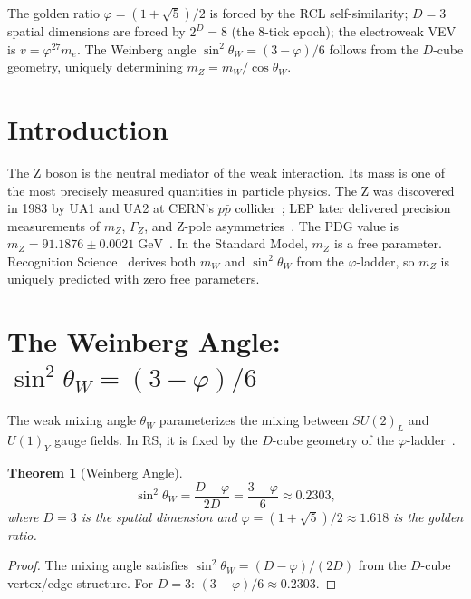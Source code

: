 \documentclass[12pt,a4paper]{article}
\newtheorem{theorem}{Theorem}[section]
\theoremstyle{definition}
\theoremstyle{remark}
\begin{document}
\noindent The golden ratio $\varphi=(1+\sqrt{5})/2$ is forced by the
RCL self-similarity; $D=3$ spatial dimensions are forced by $2^D=8$
(the 8-tick epoch); the electroweak VEV is $v = \varphi^{27}m_e$.  The
Weinberg angle $\sin^2\theta_W = (3-\varphi)/6$ follows from the
$D$-cube geometry, uniquely determining $m_Z = m_W/\cos\theta_W$.

\section{Introduction}
\label{sec:intro}

The Z boson is the neutral mediator of the weak interaction.  Its
mass is one of the most precisely measured quantities in particle
physics.  The Z was discovered in 1983 by UA1 and UA2 at CERN's
$p\bar{p}$ collider~\cite{UA1,UA2}; LEP later delivered precision
measurements of $m_Z$, $\Gamma_Z$, and Z-pole asymmetries~\cite{LEP}.
The PDG value is $m_Z = 91.1876 \pm 0.0021\;\mathrm{GeV}$~\cite{PDG2024}.
In the Standard Model, $m_Z$ is a free parameter.  Recognition
Science~\cite{RS_Axioms} derives both $m_W$ and $\sin^2\theta_W$ from
the $\varphi$-ladder, so $m_Z$ is uniquely predicted with zero free
parameters.

\section{The Weinberg Angle: $\sin^2\theta_W = (3 - \varphi)/6$}
\label{sec:weinberg}

The weak mixing angle $\theta_W$ parameterizes the mixing between
$SU(2)_L$ and $U(1)_Y$ gauge fields.  In RS, it is fixed by the
$D$-cube geometry of the $\varphi$-ladder~\cite{RS_Weinberg}.

\begin{theorem}[Weinberg Angle]
\label{thm:weinberg}
\begin{equation}
  \sin^2\theta_W = \frac{D - \varphi}{2D}
  = \frac{3 - \varphi}{6} \approx 0.2303,
\end{equation}
where $D = 3$ is the spatial dimension and
$\varphi = (1 + \sqrt{5})/2 \approx 1.618$ is the golden ratio.
\end{theorem}

\begin{proof}
The mixing angle satisfies $\sin^2\theta_W = (D - \varphi)/(2D)$
from the $D$-cube vertex/edge structure.  For $D = 3$:
$(3 - \varphi)/6 \approx 0.2303$.
\end{proof}
\end{document}
